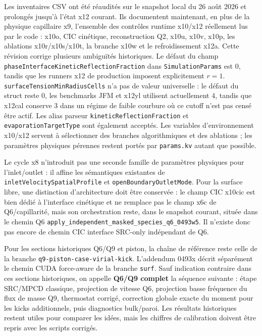 \documentclass[11pt,a4paper]{article}
\begin{document}
Les inventaires CSV ont été réaudités sur le snapshot local du 26 août 2026 et prolongés jusqu'à l'état x12 courant. Ils documentent maintenant, en plus de la physique capillaire x9, l'ensemble des contrôles runtime x10/x12 réellement lus par le code : x10o, CIC cinétique, reconstruction Q2, x10u, x10v, x10p, les ablations x10r/x10s/x10t, la branche x10w et le refroidissement x12a. Cette révision corrige plusieurs ambiguïtés historiques. Le défaut du champ \texttt{phaseInterfaceKineticReflectionFraction} dans \texttt{SimulationParams} est $0$, tandis que les runners x12 de production imposent explicitement $r=1$. \texttt{surfaceTensionMinRadiusCells} n'a pas de valeur universelle : le défaut du struct reste $0$, les benchmarks JFM et x12yl utilisent actuellement 4, tandis que x12cal conserve 3 dans un régime de faible courbure où ce cutoff n'est pas censé être actif. Les alias parseur \texttt{kineticReflectionFraction} et \texttt{evaporationTargetType} sont également acceptés. Les variables d'environnement x10/x12 servent à sélectionner des branches algorithmiques et des ablations ; les paramètres physiques pérennes restent portés par \texttt{params.kv} autant que possible.

Le cycle x8 n'introduit pas une seconde famille de paramètres physiques pour l'inlet/outlet : il affine les sémantiques existantes de \texttt{inletVelocitySpatialProfile} et \texttt{openBoundaryOutletMode}. Pour la surface libre, une distinction d'architecture doit être conservée : le champ CIC x10cic est bien dédié à l'interface cinétique et ne remplace pas le champ x6c de Q6/capillarité, mais son orchestration reste, dans le snapshot courant, située dans le chemin Q6 \texttt{apply\_independent\_masked\_species\_q6\_0493w5}. Il n'existe donc pas encore de chemin CIC interface SRC-only indépendant de Q6.


Pour les sections historiques Q6/Q9 et piston, la chaîne de référence reste celle de la branche \texttt{q9-piston-case-virial-kick}. L'addendum 0493x décrit séparément le chemin CUDA force-aware de la branche \texttt{surf}. Sauf indication contraire dans ces sections historiques, on appelle \textbf{Q6/Q9 complet} la séquence suivante : étape SRC/MPCD classique, projection de vitesse Q6, projection basse fréquence du flux de masse Q9, thermostat corrigé, correction globale exacte du moment pour les kicks additionnels, puis diagnostics bulk/paroi. Les résultats historiques restent utiles pour comparer les idées, mais les chiffres de calibration doivent être repris avec les scripts corrigés.
\end{document}
